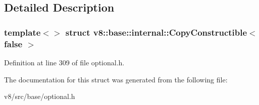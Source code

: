 \subsection{Detailed Description}
\subsubsection*{template$<$$>$\newline
struct v8\+::base\+::internal\+::\+Copy\+Constructible$<$ false $>$}



Definition at line 309 of file optional.\+h.



The documentation for this struct was generated from the following file\+:\begin{DoxyCompactItemize}
\item 
v8/src/base/optional.\+h\end{DoxyCompactItemize}
